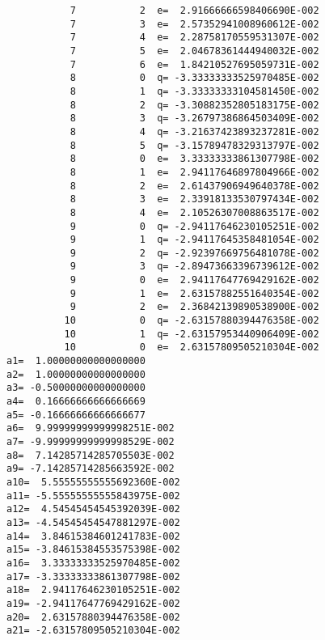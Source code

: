 \documentclass{article}
\begin{document}
\begin{verbatim}
           7           2  e=  2.91666666598406690E-002
           7           3  e=  2.57352941008960612E-002
           7           4  e=  2.28758170559531307E-002
           7           5  e=  2.04678361444940032E-002
           7           6  e=  1.84210527695059731E-002
           8           0  q= -3.33333333525970485E-002
           8           1  q= -3.33333333104581450E-002
           8           2  q= -3.30882352805183175E-002
           8           3  q= -3.26797386864503409E-002
           8           4  q= -3.21637423893237281E-002
           8           5  q= -3.15789478329313797E-002
           8           0  e=  3.33333333861307798E-002
           8           1  e=  2.94117646897804966E-002
           8           2  e=  2.61437906949640378E-002
           8           3  e=  2.33918133530797434E-002
           8           4  e=  2.10526307008863517E-002
           9           0  q= -2.94117646230105251E-002
           9           1  q= -2.94117645358481054E-002
           9           2  q= -2.92397669756481078E-002
           9           3  q= -2.89473663396739612E-002
           9           0  e=  2.94117647769429162E-002
           9           1  e=  2.63157882551640354E-002
           9           2  e=  2.36842139890538900E-002
          10           0  q= -2.63157880394476358E-002
          10           1  q= -2.63157953440906409E-002
          10           0  e=  2.63157809505210304E-002
a1=  1.00000000000000000     
a2=  1.00000000000000000     
a3= -0.50000000000000000     
a4=  0.16666666666666669     
a5= -0.16666666666666677     
a6=  9.99999999999998251E-002
a7= -9.99999999999998529E-002
a8=  7.14285714285705503E-002
a9= -7.14285714285663592E-002
a10=  5.55555555555692360E-002
a11= -5.55555555555843975E-002
a12=  4.54545454545392039E-002
a13= -4.54545454547881297E-002
a14=  3.84615384601241783E-002
a15= -3.84615384553575398E-002
a16=  3.33333333525970485E-002
a17= -3.33333333861307798E-002
a18=  2.94117646230105251E-002
a19= -2.94117647769429162E-002
a20=  2.63157880394476358E-002
a21= -2.63157809505210304E-002
\end{verbatim}
\end{document}
